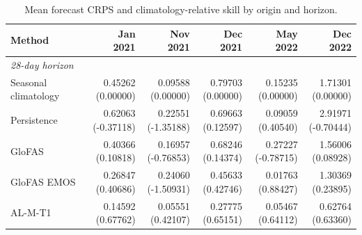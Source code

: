\begin{table}[!htbp]
\centering
\begin{threeparttable}
\caption{Mean forecast CRPS and climatology-relative skill by origin and horizon.}
\label{tab:comment2_external_by_origin}
\fontsize{8.5}{10.5}\selectfont
\begin{tabular}{lrrrrr}
\hline
Method & Jan 2021 & Nov 2021 & Dec 2021 & May 2022 & Dec 2022 \\
\hline
\multicolumn{6}{l}{\textit{28-day horizon}} \\
Seasonal climatology & \shortstack[r]{0.45262\\(0.00000)} & \shortstack[r]{0.09588\\(0.00000)} & \shortstack[r]{0.79703\\(0.00000)} & \shortstack[r]{0.15235\\(0.00000)} & \shortstack[r]{1.71301\\(0.00000)} \\
Persistence & \shortstack[r]{0.62063\\(-0.37118)} & \shortstack[r]{0.22551\\(-1.35188)} & \shortstack[r]{0.69663\\(0.12597)} & \shortstack[r]{0.09059\\(0.40540)} & \shortstack[r]{2.91971\\(-0.70444)} \\
GloFAS & \shortstack[r]{0.40366\\(0.10818)} & \shortstack[r]{0.16957\\(-0.76853)} & \shortstack[r]{0.68246\\(0.14374)} & \shortstack[r]{0.27227\\(-0.78715)} & \shortstack[r]{1.56006\\(0.08928)} \\
GloFAS EMOS & \shortstack[r]{0.26847\\(0.40686)} & \shortstack[r]{0.24060\\(-1.50931)} & \shortstack[r]{0.45633\\(0.42746)} & \shortstack[r]{0.01763\\(0.88427)} & \shortstack[r]{1.30369\\(0.23895)} \\
AL-M-T1 & \shortstack[r]{0.14592\\(0.67762)} & \shortstack[r]{0.05551\\(0.42107)} & \shortstack[r]{0.27775\\(0.65151)} & \shortstack[r]{0.05467\\(0.64112)} & \shortstack[r]{0.62764\\(0.63360)} \\

\end{tabular}
\end{threeparttable}
\end{table}
